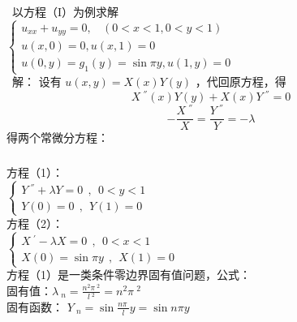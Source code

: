 \begin{frame}
	\frametitle{}
	 以方程（I）为例求解\\
	$\displaystyle \begin{cases}
		u_{xx} +u_{yy} =0 ,~~~~ (0<x<1, 0<y<1)\\
		u(x,0)= 0,  u(x,1)= 0 \\
		u(0,y)= g_1 (y) =\sin \pi y,  u(1,y)= 0
	\end{cases}$ \\
	\alert{ 解：}	设有 	$ u(x,y)=X(x) Y(y)$ ，代回原方程，得
	\begin{equation*}
		X~^{''}(x)Y(y) +X(x)Y~^{''}=0
	\end{equation*}
	\begin{equation*}
		-\frac{X~^{''}}{X}=\frac{Y~^{''} }{Y} =-\lambda 
	\end{equation*}	
	得两个常微分方程：
\end{frame}	

\begin{frame}
	\frametitle{}	
	方程（1）：\\
	$\displaystyle  \begin{cases}
		Y~^{''} +\lambda Y=0  ~~,~~ 0<y<1\\
		Y(0)=0 ~~,~~Y(1)=0 
	\end{cases}$ \\	
	方程（2）：\\
	$\displaystyle  \begin{cases}
		X~^{'} -\lambda X=0  ~~,~~ 0<x<1 \\
		X(0)=\sin \pi y~~,~~X(1)=0 
	\end{cases}$ \\	\vspace{0.3em}
	方程（1）是一类条件零边界固有值问题，公式：\\
	固有值：$\displaystyle  \lambda~_n=\frac{n^2\pi~^2}{l~^2} =n^2\pi~^2$ \\ 
	固有函数： $\displaystyle  Y~_n= \sin \frac{n\pi~}{l} y = \sin n \pi y $ \\	
\end{frame}	

